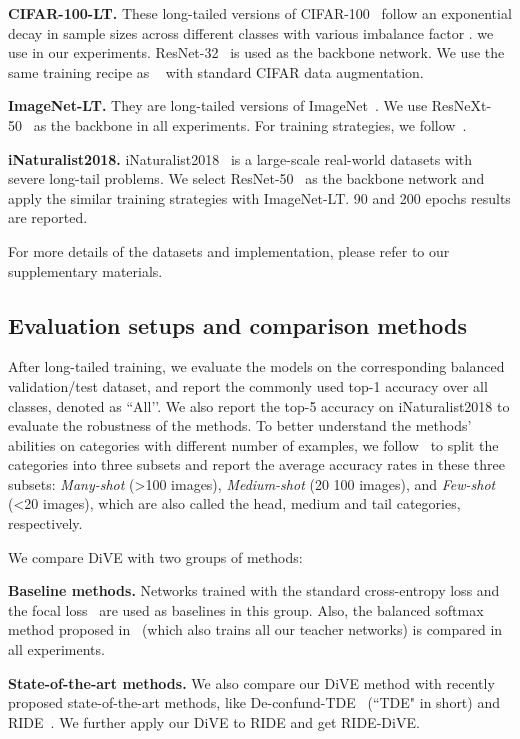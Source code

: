 \documentclass[10pt,twocolumn,letterpaper]{article}
\newcommand{\squishlist}{
	\begin{list}{}
		{ \setlength{\itemsep}{0pt}
			\setlength{\parsep}{1pt}
			\setlength{\topsep}{1pt}
			\setlength{\partopsep}{0pt}
			\setlength{\leftmargin}{1.5em}
			\setlength{\labelwidth}{1em}
			\setlength{\labelsep}{0.5em} } }
\newcommand{\squishend}{\end{list} 
}
\begin{document}
\textbf{CIFAR-100-LT.} 
These long-tailed versions of CIFAR-100~\cite{cui2019classbalance} follow an exponential decay in sample sizes across different classes with various imbalance factor . we use  in our experiments. ResNet-32~\cite{he2016deep} is used as the backbone network. We use the same training recipe as ~\cite{zhou2020BBN} with standard CIFAR data augmentation.

\textbf{ImageNet-LT.}
They are long-tailed versions of ImageNet~\cite{liu2019openlongtailrecognition}. We use ResNeXt-50~\cite{xie2017resnext} as the backbone in all experiments. For training strategies, we follow~\cite{kang2019decoupling}.

\textbf{iNaturalist2018.}
iNaturalist2018~\cite{cui2018large} is a large-scale real-world datasets with severe long-tail problems. We select ResNet-50~\cite{he2016deep} as the backbone network and apply the similar training strategies with ImageNet-LT. 90 and 200 epochs results are reported.

For more details of the datasets and implementation, please refer to our supplementary materials.

\subsection{Evaluation setups and comparison methods} \label{sec:evaluation}

After long-tailed training, we evaluate the models on the corresponding balanced validation/test dataset, and report the commonly used top-1 accuracy over all classes, denoted as ``All’’. We also report the top-5 accuracy on iNaturalist2018 to evaluate the robustness of the methods. To better understand the methods' abilities on categories with different number of examples, we follow~\cite{kang2019decoupling,liu2019openlongtailrecognition} to split the categories into three subsets and report the average accuracy rates in these three subsets: \emph{Many-shot} (\textgreater 100 images), \emph{Medium-shot} (20  100 images), and \emph{Few-shot} (\textless 20 images), which are also called the head, medium and tail categories, respectively.

We compare DiVE with two groups of methods:
\squishlist
	\item \textbf{Baseline methods.} Networks trained with the standard cross-entropy loss and the focal loss~\cite{lin2017focal} are used as baselines in this group. Also, the balanced softmax method proposed in~\cite{ren2020BALMS} (which also trains all our teacher networks) is compared in all experiments. 
	\item \textbf{State-of-the-art methods.} We also compare our DiVE method with recently proposed state-of-the-art methods, like De-confund-TDE~\cite{tang2020longtailed} (``TDE" in short) and RIDE~\cite{wang2020long}. We further apply our DiVE to RIDE and get RIDE-DiVE.
\squishend
\end{document}
